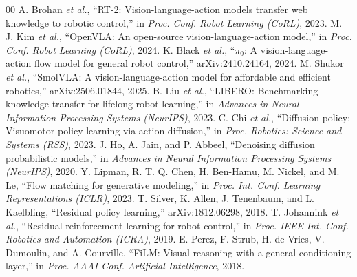 \documentclass[conference]{IEEEtran}
\begin{document}
\begin{thebibliography}{00}
 A. Brohan \emph{et al.}, ``RT-2: Vision-language-action models transfer web knowledge to robotic control,'' in \emph{Proc. Conf. Robot Learning (CoRL)}, 2023.
 M. J. Kim \emph{et al.}, ``OpenVLA: An open-source vision-language-action model,'' in \emph{Proc. Conf. Robot Learning (CoRL)}, 2024.
 K. Black \emph{et al.}, ``$\pi_0$: A vision-language-action flow model for general robot control,'' arXiv:2410.24164, 2024.
 M. Shukor \emph{et al.}, ``SmolVLA: A vision-language-action model for affordable and efficient robotics,'' arXiv:2506.01844, 2025.
 B. Liu \emph{et al.}, ``LIBERO: Benchmarking knowledge transfer for lifelong robot learning,'' in \emph{Advances in Neural Information Processing Systems (NeurIPS)}, 2023.
 C. Chi \emph{et al.}, ``Diffusion policy: Visuomotor policy learning via action diffusion,'' in \emph{Proc. Robotics: Science and Systems (RSS)}, 2023.
 J. Ho, A. Jain, and P. Abbeel, ``Denoising diffusion probabilistic models,'' in \emph{Advances in Neural Information Processing Systems (NeurIPS)}, 2020.
 Y. Lipman, R. T. Q. Chen, H. Ben-Hamu, M. Nickel, and M. Le, ``Flow matching for generative modeling,'' in \emph{Proc. Int. Conf. Learning Representations (ICLR)}, 2023.
 T. Silver, K. Allen, J. Tenenbaum, and L. Kaelbling, ``Residual policy learning,'' arXiv:1812.06298, 2018.
 T. Johannink \emph{et al.}, ``Residual reinforcement learning for robot control,'' in \emph{Proc. IEEE Int. Conf. Robotics and Automation (ICRA)}, 2019.
 E. Perez, F. Strub, H. de Vries, V. Dumoulin, and A. Courville, ``FiLM: Visual reasoning with a general conditioning layer,'' in \emph{Proc. AAAI Conf. Artificial Intelligence}, 2018.
\end{thebibliography}
\end{document}
